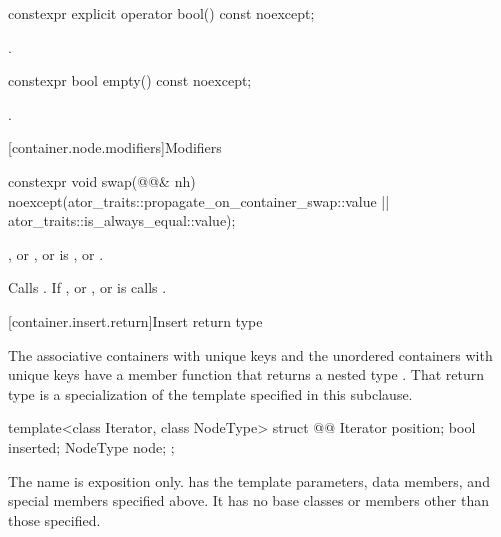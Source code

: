 \begin{itemdecl}
constexpr explicit operator bool() const noexcept;
\end{itemdecl}

\begin{itemdescr}
\pnum
\returns
{}.
\end{itemdescr}

\begin{itemdecl}
constexpr bool empty() const noexcept;
\end{itemdecl}

\begin{itemdescr}
\pnum
\returns
{}.
\end{itemdescr}

[container.node.modifiers]{Modifiers}

\begin{itemdecl}
constexpr void swap(@@& nh)
  noexcept(ator_traits::propagate_on_container_swap::value ||
           ator_traits::is_always_equal::value);
\end{itemdecl}

\begin{itemdescr}
\pnum
\expects
{}, or , or
 is ,
or .

\pnum
\effects
Calls . If , or
, or 
is  calls .
\end{itemdescr}

[container.insert.return]{Insert return type}

\pnum
The associative containers with unique keys and the unordered containers with unique keys
have a member function  that returns a nested type .
That return type is a specialization of the template specified in this subclause.

\begin{codeblock}
template<class Iterator, class NodeType>
struct @@
{
  Iterator position;
  bool     inserted;
  NodeType node;
};
\end{codeblock}

\pnum
The name  is exposition only.
 has the template parameters,
data members, and special members specified above.
It has no base classes or members other than those specified.

